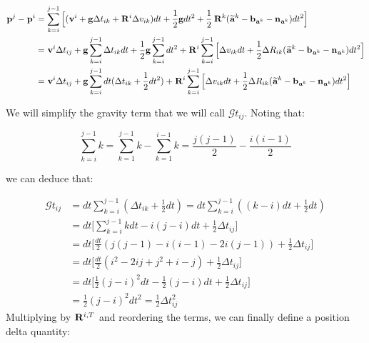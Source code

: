 \documentclass[11pt]{article}
\newcommand{\Rot}[2]{\prescript{#1}{}{\bfR}_{#2}}
\newcommand{\noise}{\bfn}
\newcommand{\posi}[2]{\prescript{#1}{}{\bfp}_{#2}}
\newcommand{\vel}[2]{\prescript{#1}{}{\bfv}_{#2}}
\newcommand{\acc}[2]{\prescript{#1}{}{\bfa}_{#2}}
\newcommand{\accm}[2]{\prescript{#1}{}{\widetilde{\bfa}}_{#2}}
\newcommand{\grav}{\bfg}
\begin{document}
\begin{equation}
\begin{split}
\posi{}{}^{j} - \posi{}{}^{i} &= \sum_{k=i}^{j-1} \Big[
(\vel{}{}^i + \grav \Delta t_{ik} + \Rot{}{}^i \Delta v_{ik})dt 
+ \frac{1}{2}\grav dt^2 + \frac{1}{2}\Rot{}{}^{k}(\accm{}{}^k - \bfb_{\acc{}{}^k} - \noise_{\acc{}{}^k})dt^2 \Big]
\\
&= \vel{}{}^i \Delta t_{ij} + 
\grav\sum_{k=i}^{j-1} \Delta t_{ik} dt + \frac{1}{2}\grav \sum_{k=i}^{j-1} dt^2 +
\Rot{}{}^i\sum_{k=i}^{j-1} \Big[\Delta v_{ik}dt +  \frac{1}{2} \Delta R_{ik} (\accm{}{}^k - \bfb_{\acc{}{}^k} - \noise_{\acc{}{}^k})dt^2 \Big]
\\
&= \vel{}{}^i \Delta t_{ij} + 
\grav \sum_{k=i}^{j-1}dt (\Delta t_{ik} + \frac{1}{2}dt^2) +
\Rot{}{}^i\sum_{k=i}^{j-1} \Big[\Delta v_{ik}dt +  \frac{1}{2} \Delta R_{ik} (\accm{}{}^k - \bfb_{\acc{}{}^k} - \noise_{\acc{}{}^k})dt^2 \Big]
\end{split}
\end{equation}

We will simplify the gravity term that we will call $\mathcal{G}t_{ij}$. Noting that:

\begin{equation*}
    \sum_{k=i}^{j-1}k = \sum_{k=1}^{j-1}k - \sum_{k=1}^{i-1}k = \frac{j(j-1)}{2} - \frac{i(i-1)}{2} 
\end{equation*}

we can deduce that:

\begin{equation*}
\begin{split}
\mathcal{G}t_{ij} 
&= dt \sum_{k=i}^{j-1}(\Delta t_{ik} + \frac{1}{2}dt) = dt \sum_{k=i}^{j-1}((k -i)dt + \frac{1}{2}dt)
\\
&= dt \Big[ \sum_{k=i}^{j-1} k dt - i(j-i)dt + \frac{1}{2}\Delta t_{ij}  \Big] 
\\
&= dt \Big[ \frac{dt}{2} (j(j-1) - i(i-1) - 2i(j-1)) + \frac{1}{2}\Delta t_{ij} \Big] 
\\
&= dt \Big[ \frac{dt}{2} (i^2 - 2ij + j^2 + i - j) + \frac{1}{2}\Delta t_{ij} \Big] 
\\
&= dt \Big[ \frac{1}{2} (j-i)^2dt - \frac{1}{2}(j - i)dt + \frac{1}{2}\Delta t_{ij} \Big]
\\
&= \frac{1}{2} (j-i)^2dt^2 = \frac{1}{2} \Delta t_{ij}^2
\end{split}
\end{equation*}
Multiplying by $\Rot{}{}^{i,T}$ and reordering the terms, we can finally define a position delta quantity:
\end{document}

